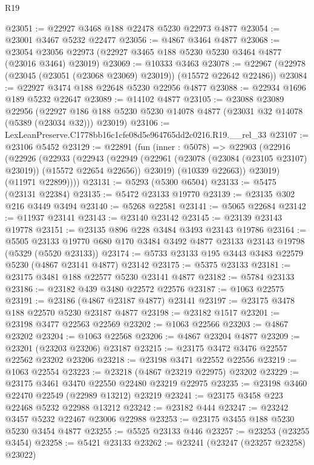 \begin{lexlean}{R19}
\begin{coremodule}
@23051 := @22927 @3468 @188 @22478 @5230 @22973 @4877
@23054 := @23001 @3467 @5232 @22477
@23056 := @4867 @3464 @4877
@23068 := @23054 @23056 @22973 (@22927 @3465 @188 @5230 @5230 @3464 @4877 (@23016 @3464) @23019)
@23069 := @10333 @3463
@23078 := @22967 (@22978 (@23045 (@23051 (@23068 @23069) @23019)) (@15572 @22642 @22486))
@23084 := @22927 @3474 @188 @22648 @5230 @22956 @4877
@23088 := @22934 @1696 @189 @5232 @22647
@23089 := @14102 @4877
@23105 := @23088
    @23089
    @22956
    (@22927 @186 @188 @5230 @5230 @14078 @4877 (@23031 @32 @14078 (@5389 (@23034 @32))) @23019)
@23106 := LexLeanPreserve.C1778bb16c1cfe08d5e964765dd2c0216.R19.__rel_33
@23107 := @23106 @5452
@23129 := @22891
    (fun (inner : @5078) =>
    @22903
      (@22916
        (@22926
          (@22933
            (@22943
              (@22949
                (@22961 (@23078 (@23084 (@23105 @23107) @23019)) (@15572 @22654 @22656))
                @23019)
              (@10339 @22663))
            @23019)
          (@11971 @22899))))
@23131 := @5293 (@5300 @6504)
@23133 := @5475 (@23131 @22384)
@23135 := @5472 @23133 @19770
@23139 := @23135 @302 @216 @3449 @3494
@23140 := @5268 @22581
@23141 := @5065 @22684
@23142 := @11937 @23141
@23143 := @23140 @23142
@23145 := @23139 @23143 @19778
@23151 := @23135 @896 @228 @3484 @3493 @23143 @19786
@23164 := @5505
    @23133
    @19770
    @680
    @170
    @3484
    @3492
    @4877
    @23133
    @23143
    @19798
    (@5329 (@5520 @23133))
@23174 := @5733 @23133 @195 @3443 @3483 @22579 @5230 (@4867 @23141 @4877) @23142
@23175 := @5375 @23133
@23181 := @23175 @3481 @188 @22577 @5230 @23141 @4877
@23182 := @5784 @23133
@23186 := @23182 @439 @3480 @22572 @22576
@23187 := @1063 @22575
@23191 := @23186 (@4867 @23187 @4877) @23141
@23197 := @23175 @3478 @188 @22570 @5230 @23187 @4877
@23198 := @23182 @1517
@23201 := @23198 @3477 @22563 @22569
@23202 := @1063 @22566
@23203 := @4867 @23202
@23204 := @1063 @22568
@23206 := @4867 @23204 @4877
@23209 := @23201 (@23203 @23206) @23187
@23215 := @23175 @3472 @3476 @22557 @22562 @23202 @23206
@23218 := @23198 @3471 @22552 @22556
@23219 := @1063 @22554
@23223 := @23218 (@4867 @23219 @22975) @23202
@23229 := @23175 @3461 @3470 @22550 @22480 @23219 @22975
@23235 := @23198 @3460 @22470 @22549 (@22989 @13212) @23219
@23241 := @23175 @3458 @223 @22468 @5232 @22988 @13212
@23242 := @23182 @444
@23247 := @23242 @3457 @5232 @22467 @23006 @22988
@23253 := @23175 @3455 @188 @5230 @5230 @3454 @4877
@23255 := @5525 @23133 @446
@23257 := @23253 (@23255 @3454)
@23258 := @5421 @23133
@23262 := @23241 (@23247 (@23257 @23258) @23022)

\end{coremodule}
\end{lexlean}

